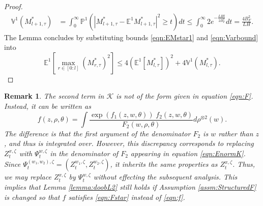 \documentclass{article}
\newtheorem{remark}[theorem]{Remark}
\begin{document}
\begin{appendices}
\begin{proof}
\begin{align}
    \mathbb{V}^1(M^*_{l+1,\tau}) &= \int_{0}^\infty \mathbb P^1\left(|M^*_{l+1,\tau} -\mathbb E^1 M^*_{l+1,\tau}|^2\ge t\right) dt
    \le \int_0^\infty 2e^{-\frac{LH t}{2 B^2_F}} dt 
     = \frac{4 B_{F}^2}{LH} .
\end{align}
The Lemma concludes by substituting bounds \eqref{eqn:EMstar1} and \eqref{eqn:Varbound} into
\[
\mathbb E^1 \left[\max_{r\in[0:l]}
 \left( M^*_{r,\tau}\right)^2
 \right]\le  4
 \left(\mathbb E^1\left[ M^*_{l,\tau}\right]\right)^2+ 4 \mathbb{V}^1(M^*_{l,\tau}).
\]
\end{proof}
\begin{remark}\label{remark:mathcalK}
The second term in $\mathcal K$ is not of the form given in equation \eqref{eqn:F}. Instead, it can be written as
\begin{equation}\label{eqn:Fstar} f(z,\rho,\theta)= \int \frac{ \exp(f_1(z,w,\theta)) \; f_2(z,w,\theta)}{F_2(w,\rho,\theta)}d\rho^{\otimes 2}( w).
\end{equation}
The difference is that the first argument of the denominator $F_2$ is $w$ rather than $z$, and thus is integrated over. However, this discrepancy corresponds to replacing $Z^{x,\zeta}_t$ with $\Psi^{w,\zeta}_t$ in the denominator of $F_2$ appearing in equation \eqref{eqn:EnormK}. Since $\Psi_{t}^{(w_1,w_2),\zeta}=(Z_t^{w_1,\zeta},Z_t^{w_2,\zeta})$, it inherits the same properties as $Z_t^{x,\zeta}$. Thus, we may replace $Z^{x,\zeta}_t$ by $\Psi^{w,\zeta}_t$ without effecting the subsequent analysis. This implies that Lemma \ref{lemma:doobL2} still holds if Assumption \ref{assm:StructuredF} is changed so that $f$ satisfies \eqref{eqn:Fstar} instead of \eqref{eqn:f}.
\end{remark}

\end{appendices}
\end{document}
